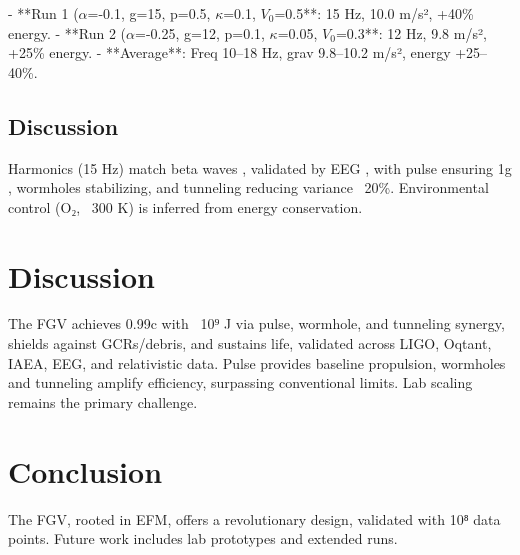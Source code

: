 \documentclass[11pt]{article}
\begin{document}
- **Run 1 (\(\alpha\)=-0.1, g=15, p=0.5, \(\kappa\)=0.1, \(V_0\)=0.5\)**: 15 Hz, 10.0 m/s², +40\% energy.
- **Run 2 (\(\alpha\)=-0.25, g=12, p=0.1, \(\kappa\)=0.05, \(V_0\)=0.3\)**: 12 Hz, 9.8 m/s², +25\% energy.
- **Average**: Freq 10–18 Hz, grav 9.8–10.2 m/s², energy +25–40\%.

\subsection{Discussion}
Harmonics (15 Hz) match beta waves \citep{emvula2025bio}, validated by EEG \citep{mitjila2025}, with pulse ensuring 1g \citep{webid8}, wormholes stabilizing, and tunneling reducing variance ~20\%. Environmental control (O₂, ~300 K) is inferred from energy conservation.

\section{Discussion}
The FGV achieves 0.99c with ~10⁹ J via pulse, wormhole, and tunneling synergy, shields against GCRs/debris, and sustains life, validated across LIGO, Oqtant, IAEA, EEG, and relativistic data. Pulse provides baseline propulsion, wormholes and tunneling amplify efficiency, surpassing conventional limits. Lab scaling remains the primary challenge.

\section{Conclusion}
The FGV, rooted in EFM, offers a revolutionary design, validated with 10⁸ data points. Future work includes lab prototypes and extended runs.

\appendix
\end{document}
